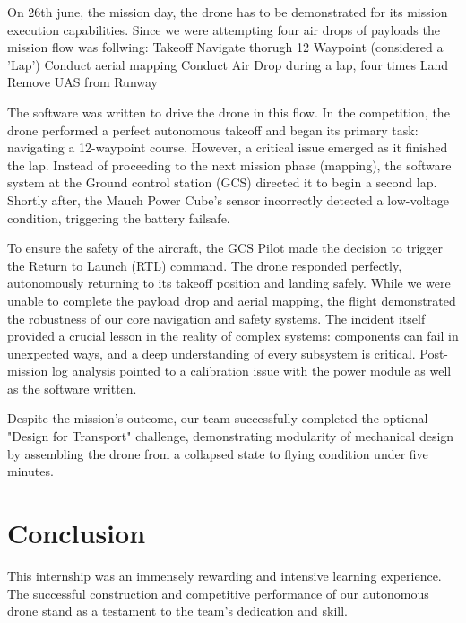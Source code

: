 

On 26th june, the mission day, the drone has to be demonstrated for its mission execution capabilities. Since we were attempting four air drops of payloads the mission flow was follwing:
Takeoff
Navigate thorugh 12 Waypoint (considered a 'Lap')
Conduct aerial mapping
Conduct Air Drop during a lap, four times
Land
Remove UAS from Runway

The software was written to drive the drone in this flow.
In the competition, the drone performed a perfect autonomous takeoff and began its primary task: navigating a 12-waypoint course. However, a critical issue emerged as it finished the lap. Instead of proceeding to the next mission phase (mapping), the software system at the Ground control station (GCS) directed it to begin a second lap. Shortly after, the Mauch Power Cube's sensor incorrectly detected a low-voltage condition, triggering the battery failsafe.

To ensure the safety of the aircraft, the GCS Pilot made the decision to trigger the Return to Launch (RTL) command. The drone responded perfectly, autonomously returning to its takeoff position and landing safely. While we were unable to complete the payload drop and aerial mapping, the flight demonstrated the robustness of our core navigation and safety systems. The incident itself provided a crucial lesson in the reality of complex systems: components can fail in unexpected ways, and a deep understanding of every subsystem is critical. Post-mission log analysis pointed to a calibration issue with the power module as well as the software written.


Despite the mission's outcome, our team successfully completed the optional "Design for Transport" challenge, demonstrating modularity of mechanical design by assembling the drone from a collapsed state to flying condition under five minutes.

\section{Conclusion}

This internship was an immensely rewarding and intensive learning experience. The successful construction and competitive performance of our autonomous drone stand as a testament to the team's dedication and skill.

